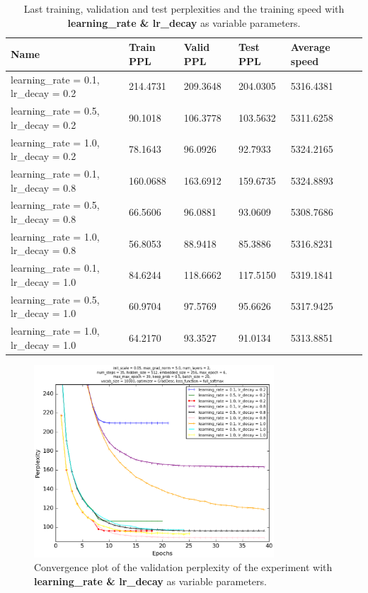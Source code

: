\documentclass[10pt,a4paper,titlepage]{article}
\begin{document}
\begin{table}[H]
\centering
\caption{Last training, validation and test perplexities and the training speed with \textbf{learning\_rate \& lr\_decay} as variable parameters.}
\label{tab:exp1data}
\begin{tabular}{|l|l|l|l|l|l|}
\hline
{\small Name} & {\small Train PPL} & {\small Valid PPL} & {\small Test PPL} & {\small Average speed}\\ \hline
{\small learning\_rate = 0.1, lr\_decay} = 0.2           & 214.4731   & 209.3648   & 204.0305   & 5316.4381  \\ \hline
{\small learning\_rate = 0.5, lr\_decay} = 0.2           & 90.1018    & 106.3778   & 103.5632   & 5311.6258  \\ \hline
{\small learning\_rate = 1.0, lr\_decay} = 0.2           & 78.1643    & 96.0926    & 92.7933    & 5324.2165  \\ \hline
{\small learning\_rate = 0.1, lr\_decay} = 0.8           & 160.0688   & 163.6912   & 159.6735   & 5324.8893  \\ \hline
{\small learning\_rate = 0.5, lr\_decay} = 0.8           & 66.5606    & 96.0881    & 93.0609    & 5308.7686  \\ \hline
{\small learning\_rate = 1.0, lr\_decay} = 0.8           & 56.8053    & 88.9418    & 85.3886    & 5316.8231  \\ \hline
{\small learning\_rate = 0.1, lr\_decay} = 1.0           & 84.6244    & 118.6662   & 117.5150   & 5319.1841  \\ \hline
{\small learning\_rate = 0.5, lr\_decay} = 1.0           & 60.9704    & 97.5769    & 95.6626    & 5317.9425  \\ \hline
{\small learning\_rate = 1.0, lr\_decay} = 1.0           & 64.2170    & 93.3527    & 91.0134    & 5313.8851  \\ \hline
\end{tabular}
\end{table}

\begin{figure}[H]
	\begin{center}
		\includegraphics[width=0.80\textwidth]{Figures/learninglrdecayperf.eps}
		\caption{Convergence plot of the validation perplexity of the experiment with \textbf{learning\_rate \& lr\_decay} as variable parameters. }
		\label{fig:exp1perf}
	\end{center}	
\end{figure}
\end{document}
